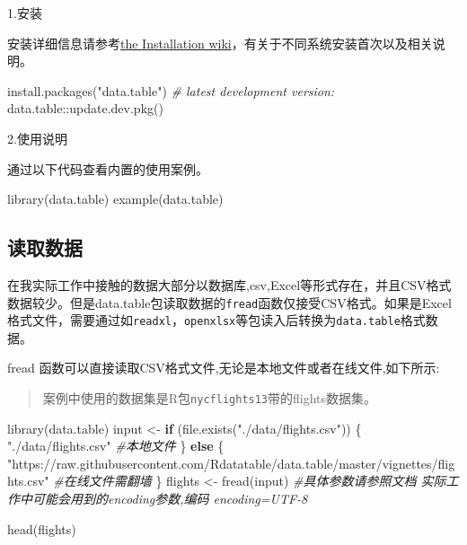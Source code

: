 \documentclass[
]{book}
\newenvironment{Shaded}{\begin{snugshade}}{\end{snugshade}}
\newcommand{\CommentTok}[1]{\textcolor[rgb]{0.56,0.35,0.01}{\textit{#1}}}
\newcommand{\ControlFlowTok}[1]{\textcolor[rgb]{0.13,0.29,0.53}{\textbf{#1}}}
\newcommand{\FunctionTok}[1]{\textcolor[rgb]{0.00,0.00,0.00}{#1}}
\newcommand{\NormalTok}[1]{#1}
\newcommand{\OtherTok}[1]{\textcolor[rgb]{0.56,0.35,0.01}{#1}}
\newcommand{\SpecialCharTok}[1]{\textcolor[rgb]{0.00,0.00,0.00}{#1}}
\newcommand{\StringTok}[1]{\textcolor[rgb]{0.31,0.60,0.02}{#1}}
\begin{document}
1.安装

安装详细信息请参考\href{https://github.com/Rdatatable/data.table/wiki/Installation}{the Installation wiki}，有关于不同系统安装首次以及相关说明。

\begin{Shaded}
\begin{Highlighting}[]
\FunctionTok{install.packages}\NormalTok{(}\StringTok{"data.table"}\NormalTok{)}
\CommentTok{\# latest development version:}
\NormalTok{data.table}\SpecialCharTok{::}\FunctionTok{update.dev.pkg}\NormalTok{()}
\end{Highlighting}
\end{Shaded}

2.使用说明

通过以下代码查看内置的使用案例。

\begin{Shaded}
\begin{Highlighting}[]
\FunctionTok{library}\NormalTok{(data.table)}
\FunctionTok{example}\NormalTok{(data.table)}
\end{Highlighting}
\end{Shaded}

\hypertarget{ux8bfbux53d6ux6570ux636e}{%
\subsection{读取数据}\label{ux8bfbux53d6ux6570ux636e}}

在我实际工作中接触的数据大部分以数据库,csv,Excel等形式存在，并且CSV格式数据较少。但是data.table包读取数据的\texttt{fread}函数仅接受CSV格式。如果是Excel格式文件，需要通过如\texttt{readxl}，\texttt{openxlsx}等包读入后转换为\texttt{data.table}格式数据。

fread 函数可以直接读取CSV格式文件,无论是本地文件或者在线文件,如下所示:

\begin{quote}
案例中使用的数据集是R包\texttt{nycflights13}带的flights数据集。
\end{quote}

\begin{Shaded}
\begin{Highlighting}[]
\FunctionTok{library}\NormalTok{(data.table)}
\NormalTok{input }\OtherTok{\textless{}{-}} \ControlFlowTok{if}\NormalTok{ (}\FunctionTok{file.exists}\NormalTok{(}\StringTok{"./data/flights.csv"}\NormalTok{)) \{}
   \StringTok{"./data/flights.csv"} \CommentTok{\#本地文件}
\NormalTok{\} }\ControlFlowTok{else}\NormalTok{ \{}
  \StringTok{"https://raw.githubusercontent.com/Rdatatable/data.table/master/vignettes/flights.csv"} \CommentTok{\#在线文件需翻墙}
\NormalTok{\}}
\NormalTok{flights }\OtherTok{\textless{}{-}} \FunctionTok{fread}\NormalTok{(input) }\CommentTok{\#具体参数请参照文档  实际工作中可能会用到的encoding参数,编码 encoding=\textquotesingle{}UTF{-}8\textquotesingle{}}

\FunctionTok{head}\NormalTok{(flights)}
\end{Highlighting}
\end{Shaded}
\end{document}
